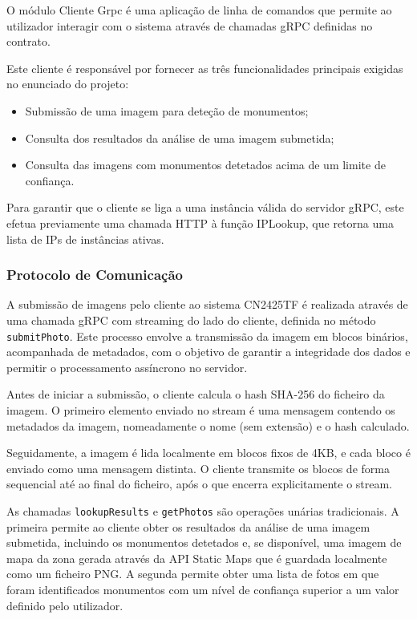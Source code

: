 O módulo Cliente Grpc é uma aplicação de linha de comandos que permite ao
utilizador interagir com o sistema através de chamadas gRPC definidas no
contrato.

Este cliente é responsável por fornecer as três funcionalidades principais
exigidas no enunciado do projeto:

\begin{itemize}
  \item Submissão de uma imagem para deteção de monumentos;
  \item Consulta dos resultados da análise de uma imagem submetida;
  \item Consulta das imagens com monumentos detetados acima de um limite de confiança.
\end{itemize}

Para garantir que o cliente se liga a uma instância válida do servidor gRPC,
este efetua previamente uma chamada HTTP à função IPLookup, que retorna uma
lista de IPs de instâncias ativas.

\subsubsection{Protocolo de Comunicação}
\label{ssec:grpc_client_protocol}

A submissão de imagens pelo cliente ao sistema CN2425TF é realizada através de
uma chamada gRPC com streaming do lado do cliente, definida no método
\texttt{submitPhoto}. Este processo envolve a transmissão da imagem em blocos
binários, acompanhada de metadados, com o objetivo de garantir a integridade
dos dados e permitir o processamento assíncrono no servidor.

Antes de iniciar a submissão, o cliente calcula o hash SHA-256 do ficheiro da
imagem. O primeiro elemento enviado no stream é uma mensagem contendo os
metadados da imagem, nomeadamente o nome (sem extensão) e o hash calculado.

Seguidamente, a imagem é lida localmente em blocos fixos de 4KB, e cada bloco é
enviado como uma mensagem distinta. O cliente transmite os blocos de forma
sequencial até ao final do ficheiro, após o que encerra explicitamente o
stream.

As chamadas \texttt{lookupResults} e \texttt{getPhotos} são operações unárias
tradicionais. A primeira permite ao cliente obter os resultados da análise de
uma imagem submetida, incluindo os monumentos detetados e, se disponível, uma
imagem de mapa da zona gerada através da API Static Maps que é guardada
localmente como um ficheiro PNG. A segunda permite obter uma lista de fotos em
que foram identificados monumentos com um nível de confiança superior a um
valor definido pelo utilizador.

